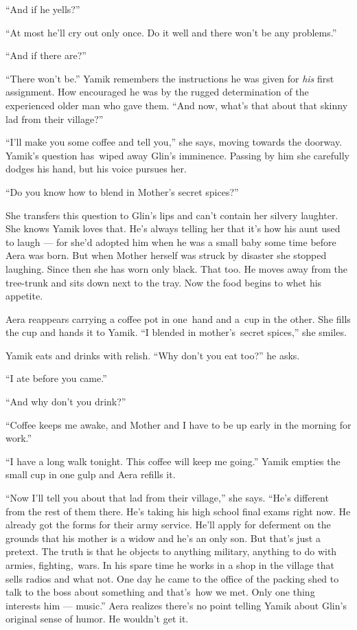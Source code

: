 \documentclass[twoside,11pt,openany]{book}
\begin{document}
{}``And if he yells?''

{}``At most he'll cry out only once. Do it well and there won't be any problems.''

{}``And if there are?''

``There won't be.'' Yamik remembers the instructions he was given for \textit{his} first assignment.
How encouraged he was by the rugged determination of the experienced older man who gave them. ``And now, what's that
about that skinny lad from their village?''

{}``I'll make you some coffee and tell you,{}'' she says, moving towards the doorway. Yamik's question has~wiped away
Glin's {imminence}. Passing by him she carefully dodges his hand, but his voice pursues her.

{}``Do you know how to blend in Mother's secret spices?''

She transfers this question to Glin's lips and can't contain her silvery laughter. She knows Yamik loves that. He's
always telling her that it's how his aunt used to laugh ---  for she'd adopted him when he was a small baby some
time before Aera was born. But when Mother herself was struck by disaster she stopped laughing. Since then she has
worn only black. That too. He moves away from the tree-trunk and sits down next to the tray. Now the food begins to
whet his appetite.

Aera reappears carrying a coffee pot in one~hand and a~cup in the other. She fills the cup and hands it to Yamik. ``I
blended in mother's~secret spices,'' she smiles.

Yamik eats and drinks with relish. ``Why don't you eat too?'' he asks.

{}``I ate before you came.''

{}``And why don't you drink?''

{}``Coffee keeps me awake, and Mother and I have to be up early in the morning for work.''

{}``I have a long walk tonight. This coffee will keep me going.'' Yamik empties the small cup in one gulp and Aera
refills it.

{}``Now I'll tell you about that lad from their village,'' she says. {}``He's different from the rest of them there.
He's taking his high school final exams right now. He already got the forms for their army service. He'll apply for
deferment on the grounds that his mother is a widow and he's an only son. But that's just a pretext. The truth is that
he objects to anything military, anything to do with armies, fighting,~wars. In his spare time he works in a shop in
the village that sells radios and what not. One day he came to the office of the packing shed to talk to the
boss about something and that's~how we met. Only one thing interests him --- music.'' Aera realizes there's no point
telling Yamik about Glin's original{ }sense of humor. He wouldn't get it.
\end{document}
